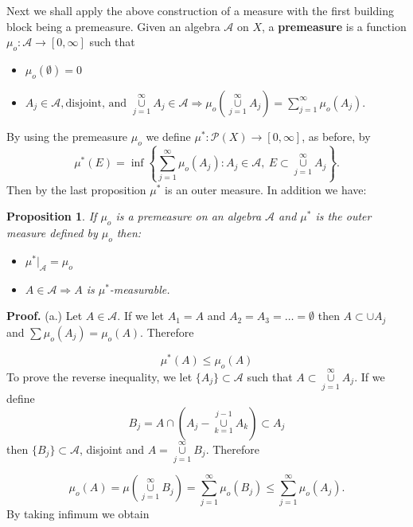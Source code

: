 \documentclass[12pt]{report}
\newtheorem{prop}[theorem]{Proposition}
\begin{document}
\medskip
\noindent 
Next we shall apply the above construction of a measure
 with the first building block being a premeasure. Given
 an algebra $\mathcal{A}$ on $X$, a {\bf  premeasure} is a function  
$\mu_o:
\mathcal{A} \longrightarrow [0, \infty]$  such that
\begin{itemize}
\item[1. ] $\mu_o(\emptyset) = 0$
\item[2. ] $\displaystyle{ A_j \in \mathcal{A}, \mbox{disjoint, and }
\overset{\infty}{\underset{j=1}{\cup}}  A_j \in \mathcal{A}
\Longrightarrow
\mu_o(\overset{\infty}{\underset{j=1}{\cup}}  A_j) =\sum^\infty_{j=1}
\mu_o(A_j).} $
\end{itemize} By using the premeasure $\mu_o$ we define $\mu^*:
\mathcal{P}(X)
\longrightarrow [0,
\infty]$, as before, by
\begin{equation*}
\mu^* (E) = \inf \left \{ \sum^\infty_{j =1} \mu_o(A_j): A_j \in
\mathcal{A}, \ E
\subset \overset{\infty}{\underset{j=1}{\cup}}  A_j \right \}.
\end{equation*} Then by the last proposition $\mu^*$ is an outer measure. 
In addition we have:


\begin{prop}  If $\mu_o$ is a premeasure on an algebra
$\mathcal{A}$ and
$\mu^*$ is the outer measure defined by $\mu_o$ then:
\begin{itemize}
\item[(a)]  $\mu^*\vert_{\mathcal{A}} = \mu_o$
\item[(b)] $A \in \mathcal{A} \Longrightarrow A $ is $\mu^*$-measurable.
\end{itemize}
\end{prop}
\noindent 
{\bf Proof.}  (a.)  Let $A \in \mathcal{A}$.  If we let $A_1 = A$ and
$A_2 = A_3 =
\dots = \emptyset$ then $A \subset \cup A_j$ and $\sum\mu_o(A_j) =
\mu_o(A)$.   Therefore

\begin{equation*}
 \mu^* (A) \le \mu_o(A)
\end{equation*} To prove the reverse inequality, we let $\{A_j\} \subset
\mathcal{A}$ such that $ A
\subset \overset{\infty}{\underset{j=1}{\cup}}  A_j$.  If we define
\[ B_j = A \cap \left ( A_j - \overset{j-1}{\underset{k=1}{\cup}} A_k
\right )
\subset A_j
\] then $\{B_j\} \subset \mathcal{A}$, disjoint and $A =
\overset{\infty}{\underset{j=1}{\cup}}  B_j$.  Therefore

\[
\mu_o (A) = \mu \left (\overset{\infty}{\underset{j=1}{\cup}}  B_j \right )
=
\sum^\infty_{j =1} \mu_o(B_j) \le \sum^\infty_{j=1} \mu_o (A_j).
\] By taking infimum we obtain
\end{document}

